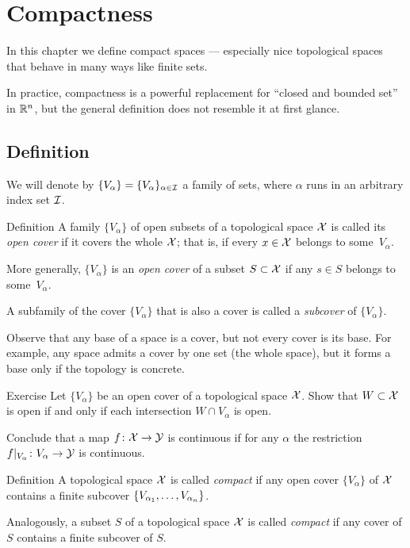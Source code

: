 \chapter{Compactness}\label{chap:compactness}

In this chapter we define compact spaces --- especially nice topological spaces that behave in many ways like finite sets.


In practice, compactness is a powerful replacement for ``closed and bounded set'' in $\mathbb{R}^n$, but the general definition does not resemble it at first glance.

\section{Definition}

We will denote by $\{V_\alpha\}=\{V_\alpha\}_{\alpha\in \mathcal{I}}$ a family of sets, where $\alpha$ runs in an arbitrary index set $\mathcal{I}$.

\begin{thm}{Definition}\label{def:cover}
A family $\{V_\alpha\}$ of open subsets of a topological space $\mathcal{X}$ is called its \emph{open cover} if it covers the whole $\mathcal{X}$;
that is, if every $x\in \mathcal{X}$ belongs to some~$V_\alpha$.

More generally, $\{V_\alpha\}$ is an \emph{open cover} of a subset $S\subset \mathcal{X}$ if any $s\in S$ belongs to some~$V_\alpha$.

A subfamily of the cover $\{V_\alpha\}$ that is also a cover is called a \emph{subcover} of $\{V_\alpha\}$.
\end{thm}

Observe that any base of a space is a cover, but not every cover is its base.
For example, any space admits a cover by one set (the whole space), but it forms a base only if the topology is concrete.

\begin{thm}{Exercise}\label{ex:open-open-cover}
Let $\{V_\alpha\}$ be an open cover of a topological space $\mathcal{X}$.
Show that $W\subset \mathcal{X}$ is open if and only if each intersection $W\cap V_\alpha$ is open.

Conclude that a map $f\colon\mathcal{X}\to \mathcal{Y}$ is continuous if for any $\alpha$ the restriction $f|_{V_\alpha}\colon V_\alpha\to\mathcal{Y}$ is continuous.
\end{thm}

\begin{thm}{Definition}
A topological space $\mathcal{X}$ is called \emph{compact} if any open cover $\{V_\alpha\}$ of $\mathcal{X}$
contains a finite subcover $\{V_{\alpha_1},\z\ldots,V_{\alpha_n}\}$.

Analogously, a subset $S$ of a topological space $\mathcal{X}$ is called {}\emph{compact} if any cover of $S$
contains a finite subcover of $S$.
\end{thm}

